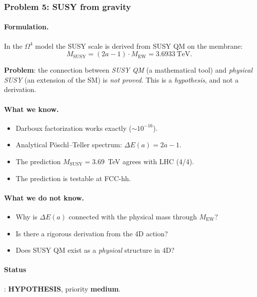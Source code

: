 \documentclass[11pt,a4paper]{article}
\newcommand{\Om}{\ensuremath{\Omega^4}}
\theoremstyle{definition}
\begin{document}
\subsubsection{Problem 5: SUSY from gravity}

\paragraph{Formulation.}
In the $\Om$ model the SUSY scale is derived from SUSY QM on
the membrane:
\begin{equation}
    M_{\text{SUSY}} = (2a - 1) \cdot M_{\text{EW}} = 3.6933~\text{TeV}.
\end{equation}

\medskip\noindent
\textbf{Problem}: the connection between \emph{SUSY QM} (a mathematical
tool) and \emph{physical SUSY} (an extension of the SM)
is \emph{not proved}. This is a \emph{hypothesis}, and not a derivation.

\paragraph{What we know.}
\begin{itemize}
    \item Darboux factorization works exactly ($\sim 10^{-16}$).
    \item Analytical P\"oschl--Teller spectrum:
          $\Delta E(a) = 2a - 1$.
    \item The prediction $M_{\text{SUSY}} = 3.69$~TeV
          agrees with LHC (4/4).
    \item The prediction is testable at FCC-hh.
\end{itemize}

\paragraph{What we do not know.}
\begin{itemize}
    \item Why is $\Delta E(a)$ connected with the physical mass
          through $M_{\text{EW}}$?
    \item Is there a rigorous derivation from the 4D action?
    \item Does SUSY QM exist as a \emph{physical} structure
          in 4D?
\end{itemize}

\paragraph{Status}: \textbf{HYPOTHESIS}, priority \textbf{medium}.
\end{document}
